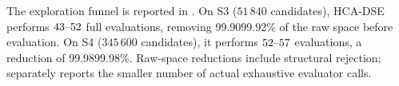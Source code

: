 %
The exploration funnel is reported in \RefFunnelSite{}. On S3 ($51\,840$ candidates), HCA-DSE performs $43\text{--}52$ full evaluations, removing 99.90\text{--}99.92\% of the raw space before evaluation. On S4 ($345\,600$ candidates), it performs $52\text{--}57$ evaluations, a reduction of 99.98\text{--}99.98\%. Raw-space reductions include structural rejection; \RefFunnelTab{} separately reports the smaller number of actual exhaustive evaluator calls.
